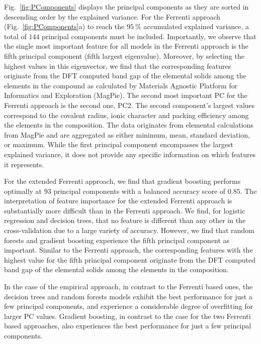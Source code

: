 \documentclass[superscriptaddress,unsortedaddress,
 amsmath,amssymb,
 aps,
]{revtex4-2}
\begin{document}
Fig.~\ref{fig:PComponents} displays the principal components as they are sorted in descending order by the explained variance. For the Ferrenti approach (Fig.~\ref{fig:PComponents}a) to reach the $95 \ \%$ accumulated explained variance, a total of $144$ principal components must be included. Importantly, we observe that the single most important feature for all models in the Ferrenti approach is the fifth principal component (fifth largest eigenvalue). Moreover, by selecting the highest values in this eigenvector, we find that the corresponding features originate from the DFT computed band gap of the elemental solids among the elements in the compound as calculated by Materials Agnostic Platform for Informatics and Exploration (MagPie). 
The second most important PC for the Ferrenti approach is the second one, PC2. 
The second component's largest values correspond to the 
covalent radius, ionic character and packing efficiency  
among the elements in the composition. 
The data originates from elemental calculations from MagPie and are aggregated as either minimum, mean, standard deviation, or maximum. 
While the first principal component encompasses the largest explained variance, it does not provide any specific information on which features it represents.

For the extended Ferrenti approach, we find that gradient boosting performs optimally at $93$ principal components with a balanced accuracy score of $0.85$. The interpretation of feature importance for the extended Ferrenti approach is substantially more difficult than in the Ferrenti approach. We find, for logistic regression and decision trees, that no feature is different than any other in the cross-validation due to a large variety of accuracy. However, we find that random forests and gradient boosting experience the fifth principal component as important. Similar to the Ferrenti approach, the corresponding features with the highest value for the fifth principal component originate from the DFT computed band gap of the elemental solids among the elements in the composition. 

In the case of the empirical approach, in contrast to the Ferrenti based ones, the decision trees and random forests models exhibit the best performance for just a few principal components, and experience a considerable degree of overfitting for larger PC values. 
Gradient boosting, in contrast to the case for the two Ferrenti based approaches, also experiences the best performance for just a few principal components.
\end{document}

